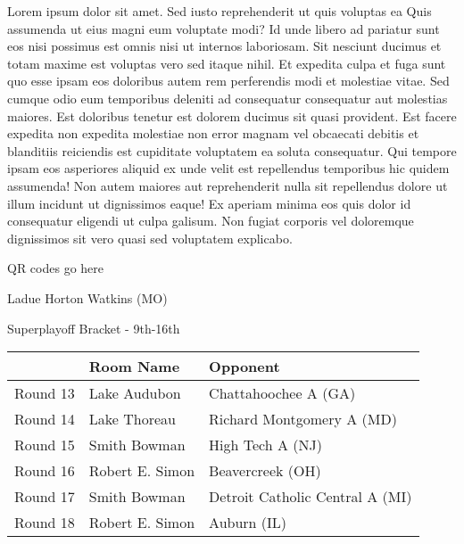 \documentclass{article}%
\begin{document}
\vspace*{8pt}%
\linebreak%
\newline%
\newline%
Lorem ipsum dolor sit amet. Sed iusto reprehenderit ut quis voluptas ea Quis assumenda ut eius magni eum voluptate modi? Id unde libero ad pariatur sunt eos nisi possimus est omnis nisi ut internos laboriosam. Sit nesciunt ducimus et totam maxime est voluptas vero sed itaque nihil. Et expedita culpa et fuga sunt quo esse ipsam eos doloribus autem rem perferendis modi et molestiae vitae.\newline%
\newline%
Sed cumque odio eum temporibus deleniti ad consequatur consequatur aut molestias maiores. Est doloribus tenetur est dolorem ducimus sit quasi provident. Est facere expedita non expedita molestiae non error magnam vel obcaecati debitis et blanditiis reiciendis est cupiditate voluptatem ea soluta consequatur. Qui tempore ipsam eos asperiores aliquid ex unde velit est repellendus temporibus hic quidem assumenda!\newline%
\newline%
Non autem maiores aut reprehenderit nulla sit repellendus dolore ut illum incidunt ut dignissimos eaque! Ex aperiam minima eos quis dolor id consequatur eligendi ut culpa galisum. Non fugiat corporis vel doloremque dignissimos sit vero quasi sed voluptatem explicabo.\newline%
\newline%
%
\vspace*{30pt}%
\begin{center}%
\begin{Huge}%
QR codes go here%
\end{Huge}%
\end{center}%
\newpage%
\begin{center}%
\begin{Huge}%
Ladue Horton Watkins (MO)%
\end{Huge}%
\vspace*{8pt}%
\linebreak%
\begin{Large}%
Superplayoff Bracket {-} 9th{-}16th%
\end{Large}%
\end{center}%
%
\begin{tabularx}{\textwidth}{|c|Y|Y|}%
\hline%
&Room Name&Opponent\\%
\hline%
Round 13&Lake Audubon&Chattahoochee A (GA)\\%
Round 14&Lake Thoreau&Richard Montgomery A (MD)\\%
Round 15&Smith Bowman&High Tech A (NJ)\\%
Round 16&Robert E. Simon&Beavercreek (OH)\\%
Round 17&Smith Bowman&Detroit Catholic Central A (MI)\\%
Round 18&Robert E. Simon&Auburn (IL)\\%
\hline%
\end{tabularx}%
\end{document}
